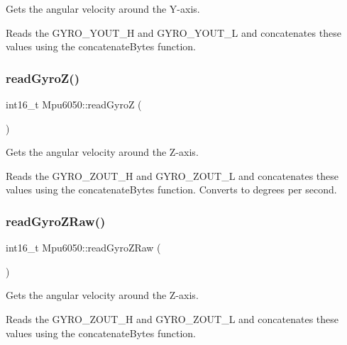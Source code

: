 Gets the angular velocity around the Y-\/axis. 

Reads the G\+Y\+R\+O\+\_\+\+Y\+O\+U\+T\+\_\+H and G\+Y\+R\+O\+\_\+\+Y\+O\+U\+T\+\_\+L and concatenates these values using the concatenate\+Bytes function. \mbox{\label{classMpu6050_ad9259b8dcbdf7f8e1473fc4b0d9273e4}} 
\subsubsection{\texorpdfstring{read\+Gyro\+Z()}{readGyroZ()}}
{\footnotesize\ttfamily int16\+\_\+t Mpu6050\+::read\+GyroZ (\begin{DoxyParamCaption}{ }\end{DoxyParamCaption})\hspace{0.3cm}{\ttfamily [virtual]}}



Gets the angular velocity around the Z-\/axis. 

Reads the G\+Y\+R\+O\+\_\+\+Z\+O\+U\+T\+\_\+H and G\+Y\+R\+O\+\_\+\+Z\+O\+U\+T\+\_\+L and concatenates these values using the concatenate\+Bytes function. Converts to degrees per second. \mbox{\label{classMpu6050_a8cf0adb003855acc603230f6fd2e3887}} 
\subsubsection{\texorpdfstring{read\+Gyro\+Z\+Raw()}{readGyroZRaw()}}
{\footnotesize\ttfamily int16\+\_\+t Mpu6050\+::read\+Gyro\+Z\+Raw (\begin{DoxyParamCaption}{ }\end{DoxyParamCaption})\hspace{0.3cm}{\ttfamily [virtual]}}



Gets the angular velocity around the Z-\/axis. 

Reads the G\+Y\+R\+O\+\_\+\+Z\+O\+U\+T\+\_\+H and G\+Y\+R\+O\+\_\+\+Z\+O\+U\+T\+\_\+L and concatenates these values using the concatenate\+Bytes function. \mbox{\label{classMpu6050_a4a5c30be51cae90371221b41518cfd84}} 
